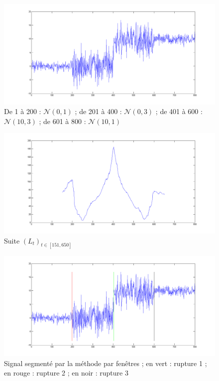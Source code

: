 \documentclass[french,11pt,notitlepage]{report}
\begin{document}
		\begin{figure}[hp]
		\includegraphics[height=0.25\textheight,width=\textwidth]{test_multi_rupt.png}
		\caption{De 1 à 200 : $\mathcal{N}(0,1)$ ; de 201 à 400 : $\mathcal{N}(0,3)$ ; de 401 à 600 : $\mathcal{N}(10,3)$ ; de 601 à 800 : $\mathcal{N}(10,1)$}
		\label{test_multi_rupt}
	\end{figure}
	
	\begin{figure}[hp]
		\includegraphics[height=0.25\textheight,width=\textwidth]{multi_rupt_llr_ex.png}
		\caption{Suite $(L_t)_{t\in[151,650]}$}
		\label{multi_rupt_llr_ex}
	\end{figure}
	
	\begin{figure}[hp]
		\includegraphics[height=0.25\textheight,width=\textwidth]{test_multi_rupt_seg.png}
		\caption{Signal segmenté par la méthode par fenêtres ; en vert : rupture 1 ; en rouge : rupture 2 ; en noir : rupture 3}
		\label{test_multi_rupt_seg}
	\end{figure}
	
\end{document}
